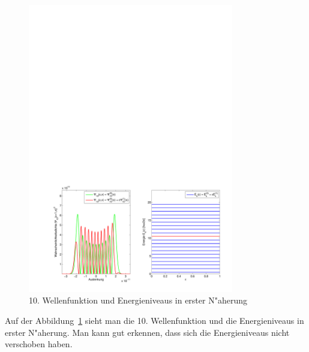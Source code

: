 \begin{refsection}
\begin{figure}	%
\centering
\includegraphics[width=0.8\textwidth]{anharmonisch/images/x3/Stoerung1Wellenfunktion.pdf}
\caption{10. Wellenfunktion und Energieniveaus in erster N"aherung
\label{skript:x3_Stoerung1Wellenfunktion}}
\end{figure}

Auf der Abbildung~\ref{skript:x3_Stoerung1Wellenfunktion} sieht man die 10. Wellenfunktion und die Energieniveaus in erster N"aherung. Man kann gut erkennen, dass sich die Energieniveaus nicht verschoben haben.


\end{refsection}
